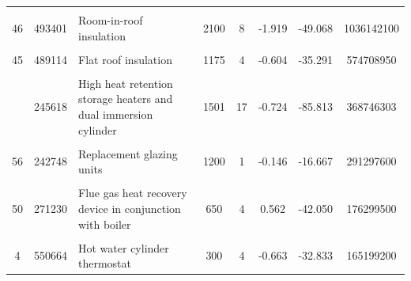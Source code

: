 \begin{table}[!h]
{\begin{tabular}[t]{cc p{6cm} ccccc}
\addlinespace
\cellcolor{gray!10}{11} & \cellcolor{gray!10}{2884072} & \cellcolor{gray!10}{Upgrade heating controls} & \cellcolor{gray!10}{400} & \cellcolor{gray!10}{2} & \cellcolor{gray!10}{-0.319} & \cellcolor{gray!10}{-15.115} & \cellcolor{gray!10}{1153628800}\\
46 & 493401 & Room-in-roof insulation & 2100 & 8 & -1.919 & -49.068 & 1036142100\\
\cellcolor{gray!10}{27} & \cellcolor{gray!10}{183775} & \cellcolor{gray!10}{Change heating to gas condensing boiler} & \cellcolor{gray!10}{5000} & \cellcolor{gray!10}{18} & \cellcolor{gray!10}{-2.203} & \cellcolor{gray!10}{-173.602} & \cellcolor{gray!10}{918875000}\\
45 & 489114 & Flat roof insulation & 1175 & 4 & -0.604 & -35.291 & 574708950\\
\cellcolor{gray!10}{5} & \cellcolor{gray!10}{1871533} & \cellcolor{gray!10}{Increase loft insulation to 270 mm} & \cellcolor{gray!10}{225} & \cellcolor{gray!10}{3} & \cellcolor{gray!10}{-0.452} & \cellcolor{gray!10}{-26.047} & \cellcolor{gray!10}{421094925}\\
\addlinespace
59 & 245618 & High heat retention storage heaters and dual immersion cylinder & 1501 & 17 & -0.724 & -85.813 & 368746303\\
\cellcolor{gray!10}{60} & \cellcolor{gray!10}{238595} & \cellcolor{gray!10}{High heat retention storage heaters} & \cellcolor{gray!10}{1346} & \cellcolor{gray!10}{9} & \cellcolor{gray!10}{-0.489} & \cellcolor{gray!10}{-64.509} & \cellcolor{gray!10}{321172730}\\
56 & 242748 & Replacement glazing units & 1200 & 1 & -0.146 & -16.667 & 291297600\\
\cellcolor{gray!10}{48} & \cellcolor{gray!10}{177252} & \cellcolor{gray!10}{High performance external doors} & \cellcolor{gray!10}{1366} & \cellcolor{gray!10}{5} & \cellcolor{gray!10}{-0.215} & \cellcolor{gray!10}{-50.209} & \cellcolor{gray!10}{242055331}\\
50 & 271230 & Flue gas heat recovery device in conjunction with boiler & 650 & 4 & 0.562 & -42.050 & 176299500\\
\addlinespace
\cellcolor{gray!10}{35} & \cellcolor{gray!10}{5700005} & \cellcolor{gray!10}{Low energy lighting for all fixed outlets} & \cellcolor{gray!10}{30} & \cellcolor{gray!10}{1} & \cellcolor{gray!10}{-0.108} & \cellcolor{gray!10}{-5.385} & \cellcolor{gray!10}{173280152}\\
4 & 550664 & Hot water cylinder thermostat & 300 & 4 & -0.663 & -32.833 & 165199200\\

\end{tabular}}
\end{table}
